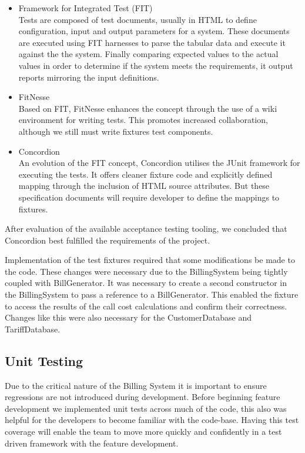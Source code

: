 \begin{itemize}
  \item Framework for Integrated Test (FIT)\\
Tests are composed of test documents, usually in HTML to define configuration, input and output parameters for a system. These documents are executed using FIT harnesses to parse the tabular data and execute it against the the system. Finally comparing expected values to the actual values in order to determine if the system meets the requirements, it output reports mirroring the input definitions. 
  \item FitNesse\\
Based on FIT, FitNesse enhances the concept through the use of a wiki environment for writing tests. This promotes increased collaboration, although we still must write fixtures test components.
  \item Concordion\\
An evolution of the FIT concept, Concordion utilises the JUnit framework for executing the tests. It offers cleaner fixture code and explicitly defined mapping through the inclusion of HTML source attributes. But these specification documents will require developer to define the mappings to fixtures.
\end{itemize}

After evaluation of the available acceptance testing tooling, we concluded that Concordion best fulfilled the requirements of the project. 

Implementation of the test fixtures required that some modifications be made to the code. These changes were necessary due to the BillingSystem being tightly coupled with BillGenerator. It was necessary to create a second constructor in the BillingSystem to pass a reference to a BillGenerator. This enabled the fixture to access the results of the call cost calculations and confirm their correctness. Changes like this were also necessary for the CustomerDatabase and TariffDatabase. 


\subsection*{Unit Testing}

Due to the critical nature of the Billing System it is important to ensure regressions are not introduced during development. Before beginning feature development we implemented unit tests across much of the code, this also was helpful for the developers to become familiar with the code-base. Having this test coverage will enable the team to move more quickly and confidently in a test driven framework with the feature development.


